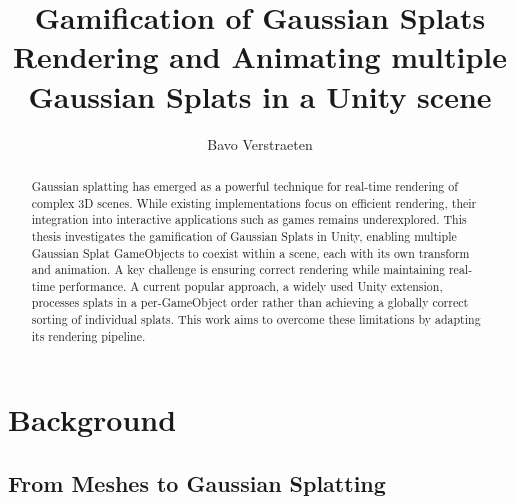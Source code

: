 \documentclass[12pt]{article}
\begin{document}
\begin{titlepage}
	\centering
	
	\title{Gamification of Gaussian Splats \\ {\large Rendering and Animating multiple Gaussian Splats in a Unity scene}}
	
	\author{Bavo Verstraeten}
	
	
	
	\maketitle
\end{titlepage}
	
\begin{abstract}
Gaussian splatting has emerged as a powerful technique for real-time rendering of complex 3D scenes. While existing implementations focus on efficient rendering, their integration into interactive applications such as games remains underexplored. This thesis investigates the gamification of Gaussian Splats in Unity, enabling multiple Gaussian Splat GameObjects to coexist within a scene, each with its own transform and animation. A key challenge is ensuring correct rendering while maintaining real-time performance. A current popular approach, a widely used Unity extension, processes splats in a per-GameObject order rather than achieving a globally correct sorting of individual splats. This work aims to overcome these limitations by adapting its rendering pipeline.
\end{abstract}

\begin{titlepage}
\centering
\tableofcontents
\end{titlepage}
\section{Background}
\subsection{From Meshes to Gaussian Splatting}
\end{document}
